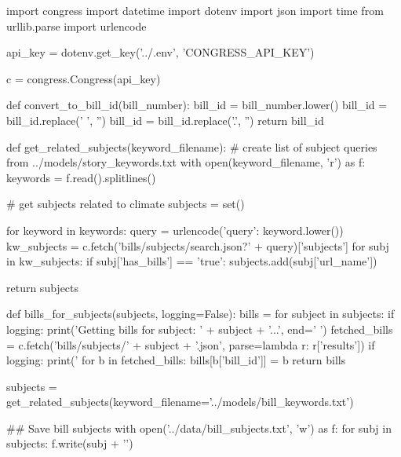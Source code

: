 
\begin{pyin}
import congress
import datetime
import dotenv
import json
import time
from urllib.parse import urlencode
\end{pyin}

\begin{pyin}
api_key = dotenv.get_key('../.env', 'CONGRESS_API_KEY')
\end{pyin}

\begin{pyin}
c = congress.Congress(api_key)
\end{pyin}

\begin{pyin}
def convert_to_bill_id(bill_number):
    bill_id = bill_number.lower()
    bill_id = bill_id.replace(' ', '')
    bill_id = bill_id.replace('.', '')
    return bill_id
\end{pyin}

\begin{pyin}
def get_related_subjects(keyword_filename):
    # create list of subject queries from ../models/story_keywords.txt
    with open(keyword_filename, 'r') as f:
        keywords = f.read().splitlines()

    # get subjects related to climate
    subjects = set()

    for keyword in keywords:
        query = urlencode({'query': keyword.lower()})
        kw_subjects = c.fetch('bills/subjects/search.json?' + query)['subjects']
        for subj in kw_subjects:
            if subj['has_bills'] == 'true':
                subjects.add(subj['url_name'])

    return subjects
\end{pyin}

\begin{pyin}
def bills_for_subjects(subjects, logging=False):
    bills = {}
    for subject in subjects:
        if logging:
            print('Getting bills for subject: ' + subject + '...', end=' ')
        fetched_bills = c.fetch('bills/subjects/' + subject + '.json', parse=lambda r: r['results'])
        if logging:
            print('%
        for b in fetched_bills:
            bills[b['bill_id']] = b
    return bills
\end{pyin}

\begin{pyin}
subjects = get_related_subjects(keyword_filename='../models/bill_keywords.txt')
\end{pyin}

\begin{pyin}
\## Save bill subjects
with open('../data/bill_subjects.txt', 'w') as f:
    for subj in subjects:
        f.write(subj + '\n')
\end{pyin}

